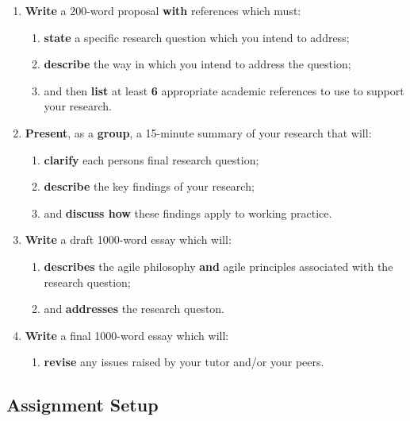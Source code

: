 \documentclass{../fal_assignment}
\begin{document}
\begin{enumerate}[label=(\Alph*)]
    \item \textbf{Write} a 200-word proposal \textbf{with} references which must:
    	\begin{enumerate}[label=\roman*.]
    		\item \textbf{state} a specific research question which you intend to address;
    		\item \textbf{describe} the way in which you intend to address the question;
    		\item and then \textbf{list} at least \textbf{6} appropriate academic references to use to support your research.
	\end{enumerate}
    \item \textbf{Present}, as a \textbf{group}, a 15-minute summary of your research that will:
    	\begin{enumerate}[label=\roman*.]
    		\item \textbf{clarify} each persons final research question;
    		\item \textbf{describe} the key findings of your research;
    		\item and \textbf{discuss how} these findings apply to working practice.
	\end{enumerate}
    \item \textbf{Write} a draft 1000-word essay which will:
    	\begin{enumerate}[label=\roman*.]
    		\item \textbf{describes} the agile philosophy \textbf{and} agile principles associated with the research question;
    		\item and \textbf{addresses} the research queston.
	\end{enumerate}
    \item \textbf{Write} a final 1000-word essay which will:
    	\begin{enumerate}[label=\roman*.]
    		\item \textbf{revise} any issues raised by your tutor and/or your peers.
	\end{enumerate}
\end{enumerate}


\subsection*{Assignment Setup}
\end{document}
